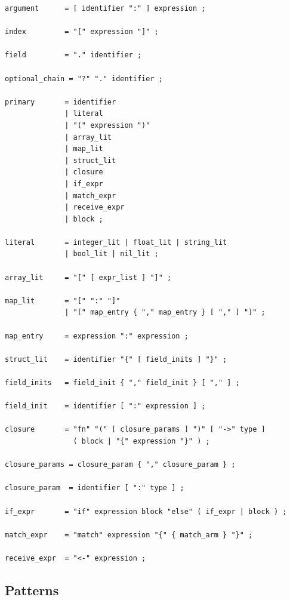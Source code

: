 \begin{lstlisting}[language=EBNF]
argument      = [ identifier ":" ] expression ;

index         = "[" expression "]" ;

field         = "." identifier ;

optional_chain = "?" "." identifier ;

primary       = identifier
              | literal
              | "(" expression ")"
              | array_lit
              | map_lit
              | struct_lit
              | closure
              | if_expr
              | match_expr
              | receive_expr
              | block ;

literal       = integer_lit | float_lit | string_lit
              | bool_lit | nil_lit ;

array_lit     = "[" [ expr_list ] "]" ;

map_lit       = "[" ":" "]"
              | "[" map_entry { "," map_entry } [ "," ] "]" ;

map_entry     = expression ":" expression ;

struct_lit    = identifier "{" [ field_inits ] "}" ;

field_inits   = field_init { "," field_init } [ "," ] ;

field_init    = identifier [ ":" expression ] ;

closure       = "fn" "(" [ closure_params ] ")" [ "->" type ]
                ( block | "{" expression "}" ) ;

closure_params = closure_param { "," closure_param } ;

closure_param  = identifier [ ":" type ] ;

if_expr       = "if" expression block "else" ( if_expr | block ) ;

match_expr    = "match" expression "{" { match_arm } "}" ;

receive_expr  = "<-" expression ;
\end{lstlisting}

\subsection{Patterns}

